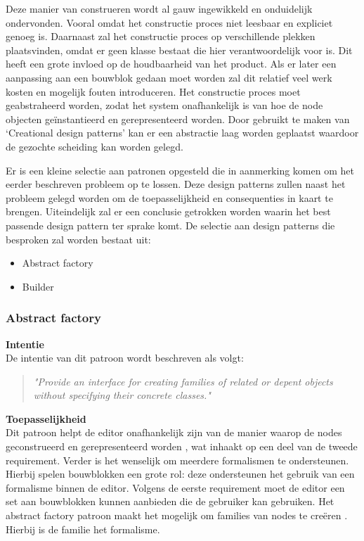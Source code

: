 \noindent Deze manier van construeren wordt al gauw ingewikkeld en onduidelijk ondervonden. Vooral omdat het constructie proces niet leesbaar en expliciet genoeg is. Daarnaast zal het constructie proces op verschillende plekken plaatsvinden, omdat er geen klasse bestaat die hier verantwoordelijk voor is. Dit heeft een grote invloed op de houdbaarheid van het product. Als er later een aanpassing aan een bouwblok gedaan moet worden zal dit relatief veel werk kosten en mogelijk fouten introduceren. Het constructie proces moet geabstraheerd worden, zodat het system onafhankelijk is van hoe de node objecten geïnstantieerd en gerepresenteerd worden. Door gebruikt te maken van ‘Creational design patterns’ kan er een abstractie laag worden geplaatst waardoor de gezochte scheiding kan worden gelegd\cite{DesignPatterns}.

Er is een kleine selectie aan patronen opgesteld die in aanmerking komen om het eerder beschreven probleem op te lossen. Deze design patterns zullen naast het probleem gelegd worden om de toepasselijkheid en consequenties in kaart te brengen. Uiteindelijk zal er een conclusie getrokken worden waarin het best passende design pattern ter sprake komt. De selectie aan design patterns die besproken zal worden bestaat uit:

\begin{itemize}
    \item Abstract factory
    \item Builder
\end{itemize}


\subsubsection{Abstract factory}
\noindent\textbf{Intentie}\\
De intentie van dit patroon wordt beschreven als volgt\cite{DesignPatterns}\cite{SourceMakingAbstractFactory}:
\begin{quote} 
    \centering    
    \textit{
        "Provide an interface for creating families of related or depent objects without specifying their concrete classes."       
    }
\end{quote}

\noindent\textbf{Toepasselijkheid}\\
Dit patroon helpt de editor onafhankelijk zijn van de manier waarop de nodes geconstrueerd en gerepresenteerd worden \cite{DesignPatterns}, wat inhaakt op een deel van de tweede requirement. Verder is het wenselijk om meerdere formalismen te ondersteunen. Hierbij spelen bouwblokken een grote rol: deze ondersteunen het gebruik van een formalisme binnen de editor. Volgens de eerste requirement moet de editor een set aan bouwblokken kunnen aanbieden die de gebruiker kan gebruiken. Het abstract factory patroon maakt het mogelijk om families van nodes te creëren \cite{DesignPatterns}. Hierbij is de familie het formalisme.
\newline

